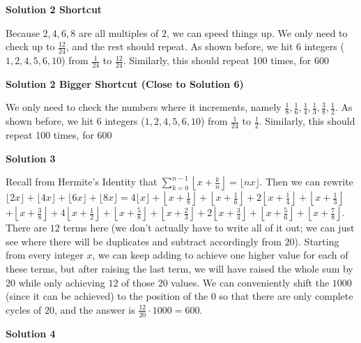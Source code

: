 \begin{enumerate}
\textbf{Solution 2 Shortcut}

Because $2,4,6,8$ are all multiples of $2$, we can speed things up. We only need to check up to $\frac{12}{24}$, and the rest should repeat. As shown before, we hit 6 integers ($1,2,4,5,6,10$) from $\frac{1}{24}$ to $\frac{12}{24}$. Similarly, this should repeat 100 times, for $\boxed{600}$




\textbf{Solution 2 Bigger Shortcut (Close to Solution 6)}

We only need to check the numbers where it increments, namely $\frac{1}{8}, \frac{1}{6}, \frac{1}{4}, \frac{1}{3}, \frac{3}{8}, \frac{1}{2}$. As shown before, we hit 6 integers ($1,2,4,5,6,10$) from $\frac{1}{24}$ to $\frac{1}{2}$. Similarly, this should repeat 100 times, for $\boxed{600}$




\textbf{Solution 3}

Recall from Hermite's Identity that $\sum_{k = 0}^{n - 1}\left\lfloor x + \frac kn\right\rfloor = \lfloor nx\rfloor$. Then we can rewrite $\lfloor 2x \rfloor + \lfloor 4x \rfloor + \lfloor 6x \rfloor + \lfloor 8x \rfloor = 4\lfloor x\rfloor + \left\lfloor x + \frac18\right\rfloor + \left\lfloor x + \frac16\right\rfloor + 2\left\lfloor x + \frac14\right\rfloor + \left\lfloor x + \frac13\right\rfloor$$+ \left\lfloor x + \frac38\right\rfloor + 4\left\lfloor x + \frac12\right\rfloor + \left\lfloor x + \frac58\right\rfloor + \left\lfloor x + \frac23\right\rfloor + 2\left\lfloor x + \frac34\right\rfloor + \left\lfloor x + \frac56\right\rfloor + \left\lfloor x + \frac78\right\rfloor$. There are $12$ terms here (we don't actually have to write all of it out; we can just see where there will be duplicates and subtract accordingly from $20$). Starting from every integer $x$, we can keep adding to achieve one higher value for each of these terms, but after raising the last term, we will have raised the whole sum by $20$ while only achieving $12$ of those $20$ values. We can conveniently shift the $1000$ (since it can be achieved) to the position of the $0$ so that there are only complete cycles of $20$, and the answer is $\frac {12}{20}\cdot1000 = \boxed{600}$.

 



\textbf{Solution 4}


\end{enumerate}
